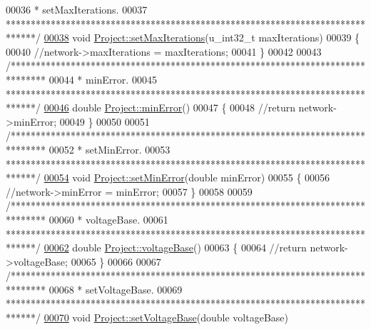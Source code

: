 \begin{DoxyCode}
00036 \textcolor{comment}{ * setMaxIterations.}
00037 \textcolor{comment}{ ******************************************************************************/}
\hypertarget{project_8cpp_source_l00038}{}\hyperlink{class_project_abac6e194d2d16fbdbe51627844eae60b}{00038} \textcolor{keywordtype}{void} \hyperlink{class_project_abac6e194d2d16fbdbe51627844eae60b}{Project::setMaxIterations}(u\_int32\_t maxIterations)
00039 \{
00040   \textcolor{comment}{//network->maxIterations = maxIterations;}
00041 \}
00042 
00043 \textcolor{comment}{/*******************************************************************************}
00044 \textcolor{comment}{ * minError.}
00045 \textcolor{comment}{ ******************************************************************************/}
\hypertarget{project_8cpp_source_l00046}{}\hyperlink{class_project_a457ed8d3b0ea5816f928977509f69a34}{00046} \textcolor{keywordtype}{double} \hyperlink{class_project_a457ed8d3b0ea5816f928977509f69a34}{Project::minError}()
00047 \{
00048   \textcolor{comment}{//return network->minError;}
00049 \}
00050 
00051 \textcolor{comment}{/*******************************************************************************}
00052 \textcolor{comment}{ * setMinError.}
00053 \textcolor{comment}{ ******************************************************************************/}
\hypertarget{project_8cpp_source_l00054}{}\hyperlink{class_project_a2cb776c39adb42a1113bf7887d0d4636}{00054} \textcolor{keywordtype}{void} \hyperlink{class_project_a2cb776c39adb42a1113bf7887d0d4636}{Project::setMinError}(\textcolor{keywordtype}{double} minError)
00055 \{
00056   \textcolor{comment}{//network->minError = minError;}
00057 \}
00058 
00059 \textcolor{comment}{/*******************************************************************************}
00060 \textcolor{comment}{ * voltageBase.}
00061 \textcolor{comment}{ ******************************************************************************/}
\hypertarget{project_8cpp_source_l00062}{}\hyperlink{class_project_a4e857ccb6162f57f5d72f4e7199e4573}{00062} \textcolor{keywordtype}{double} \hyperlink{class_project_a4e857ccb6162f57f5d72f4e7199e4573}{Project::voltageBase}()
00063 \{
00064   \textcolor{comment}{//return network->voltageBase;}
00065 \}
00066 
00067 \textcolor{comment}{/*******************************************************************************}
00068 \textcolor{comment}{ * setVoltageBase.}
00069 \textcolor{comment}{ ******************************************************************************/}
\hypertarget{project_8cpp_source_l00070}{}\hyperlink{class_project_a494c3e89851f754188c7abaedbf77ef6}{00070} \textcolor{keywordtype}{void} \hyperlink{class_project_a494c3e89851f754188c7abaedbf77ef6}{Project::setVoltageBase}(\textcolor{keywordtype}{double} voltageBase)

\end{DoxyCode}

